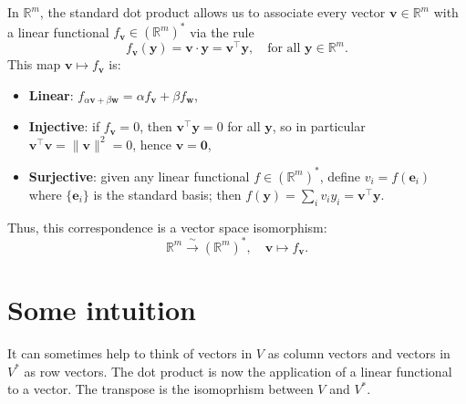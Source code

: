 \documentclass[11pt]{article}
\newcommand{\R}{\mathbb{R}}
\begin{document}
In $\R^m$, the standard dot product allows us to associate every vector $\mathbf{v} \in \R^m$ with a linear functional $f_{\mathbf{v}} \in (\R^m)^*$ via the rule
\[
f_{\mathbf{v}}(\mathbf{y}) = \mathbf{v} \cdot \mathbf{y} = \mathbf{v}^\top \mathbf{y}, \quad \text{for all } \mathbf{y} \in \R^m.
\]
This map $\mathbf{v} \mapsto f_{\mathbf{v}}$ is:
\begin{itemize}
\item \textbf{Linear}: $f_{\alpha \mathbf{v} + \beta \mathbf{w}} = \alpha f_{\mathbf{v}} + \beta f_{\mathbf{w}}$,
    \item \textbf{Injective}: if $f_{\mathbf{v}} = 0$, then $\mathbf{v}^\top \mathbf{y} = 0$ for all $\mathbf{y}$, so in particular $\mathbf{v}^\top \mathbf{v} = \|\mathbf{v}\|^2 = 0$, hence $\mathbf{v} = \mathbf{0}$,
    \item \textbf{Surjective}: given any linear functional $f \in (\R^m)^*$, define $v_i = f(\mathbf{e}_i)$ where $\{\mathbf{e}_i\}$ is the standard basis; then $f(\mathbf{y}) = \sum_i v_i y_i = \mathbf{v}^\top \mathbf{y}$.
\end{itemize}


Thus, this correspondence is a vector space isomorphism:
\[
\R^m \xrightarrow{\ \sim\ } (\R^m)^*, \quad \mathbf{v} \longmapsto f_{\mathbf{v}}.
\]

\section*{\huge Some intuition}

It can sometimes help to think of vectors in $V$ as column vectors and vectors in $V^*$ as row vectors. The dot product is now the application of a linear functional to a vector. The transpose is the isomoprhism between $V$ and $V^*$. 
\end{document}

